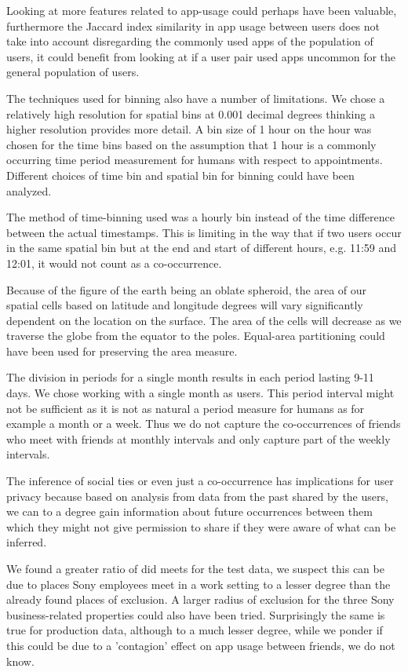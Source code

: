 Looking at more features related to app-usage could perhaps have been valuable, furthermore the Jaccard index similarity in app usage between users does not take into account disregarding the commonly used apps of the population of users, it could benefit from looking at if a user pair used apps uncommon for the general population of users.

The techniques used for binning also have a number of limitations.
We chose a relatively high resolution for spatial bins at 0.001 decimal degrees thinking a higher resolution provides more detail. A bin size of 1 hour on the hour was chosen for the time bins based on the assumption that 1 hour is a commonly occurring time period measurement for humans with respect to appointments. Different choices of time bin and spatial bin for binning could have been analyzed.

The method of time-binning used was a hourly bin instead of the time difference between the actual timestamps. This is limiting in the way that if two users occur in the same spatial bin but at the end and start of different hours, e.g. 11:59 and 12:01, it would not count as a co-occurrence.

Because of the figure of the earth being an oblate spheroid, the area of our spatial cells based on latitude and longitude degrees will vary significantly dependent on the location on the surface. The area of the cells will decrease as we traverse the globe from the equator to the poles. Equal-area partitioning could have been used for preserving the area measure.

The division in periods for a single month results in each period lasting 9-11 days. We chose working with a single month as users. This period interval might not be sufficient as it is not as natural a period measure for humans as for example a month or a week. Thus we do not capture the co-occurrences of friends who meet with friends at monthly intervals and only capture part of the weekly intervals.

The inference of social ties or even just a co-occurrence has implications for user privacy because based on analysis from data from the past shared by the users, we can to a degree gain information about future occurrences between them which they might not give permission to share if they were aware of what can be inferred.

We found a greater ratio of did meets for the test data, we suspect this can be due to places Sony employees meet in a work setting to a lesser degree than the already found places of exclusion. A larger radius of exclusion for the three Sony business-related properties could also have been tried.
Surprisingly the same is true for production data, although to a much lesser degree, while we ponder if this could be due to a 'contagion' effect on app usage between friends, we do not know.

